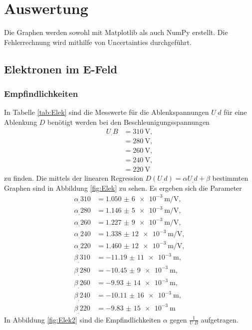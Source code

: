 \section{Auswertung}
\label{sec:Auswertung}


Die Graphen werden sowohl mit Matplotlib \cite{matplotlib} als auch NumPy \cite{numpy} erstellt. Die Fehlerrechnung wird mithilfe von Uncertainties \cite{uncertainties} durchgeführt.

\subsection{Elektronen im E-Feld}
\subsubsection{Empfindlichkeiten}
\label{sec:empf}
In Tabelle \ref{tab:Elek} sind die Messwerte für die Ablenkspannungen $U_.d$ für eine Ablenkung $D$ benötigt werden bei den Beschleunigungsspannungen
\begin{align*}
U_.B&=\SI{310}{\volt},\\
&=\SI{280}{\volt},\\
&=\SI{260}{\volt},\\
&=\SI{240}{\volt},\\
&=\SI{220}{\volt}
\end{align*}
zu finden. Die mittels der linearen Regression $D(U_.d)=\alpha U_.d + \beta$ bestimmten Graphen sind in Abbildung \ref{fig:Elek} zu sehen.
Es ergeben sich die Parameter
\begin{align*}
\alpha_.{310}&=\SI{1,050(6)e-3}{\metre\per\volt},\\
\alpha_.{280}&=\SI{1,146(5)e-3}{\metre\per\volt},\\
\alpha_.{260}&=\SI{1,227(9)e-3}{\metre\per\volt},\\
\alpha_.{240}&=\SI{1,338(12)e-3}{\metre\per\volt},\\
\alpha_.{220}&=\SI{1,460(12)e-3}{\metre\per\volt},\\
\beta_.{310}&=\SI{-11,19(11)e-3}{\metre},\\
\beta_.{280}&=\SI{-10,45(9)e-3}{\metre},\\
\beta_.{260}&=\SI{-9,93(14)e-3}{\metre},\\
\beta_.{240}&=\SI{-10,11(16)e-3}{\metre},\\
\beta_.{220}&=\SI{-9,83(15)e-3}{\metre}
\end{align*}
In Abbildung \ref{fig:Elek2} sind die Empfindlichkeiten $\alpha$ gegen $\frac{1}{U_.B}$ aufgetragen.
